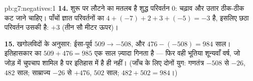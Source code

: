 \begin{solution}{pb:g7:negatives:1}
\textbf{14.} शुरू पर लौटने का मतलब है शुद्ध परिवर्तन $0$: चढ़ाव
और उतार ठीक-ठीक कट जाने चाहिए। पाँचों ज्ञात परिवर्तनों का 
$4 + (-7) + 2 + 3 + (-5) = -3$ है, इसलिए छठा परिवर्तन उसकी
 है: $+3$ (तीन सौ मीटर ऊपर)।

\textbf{15.} खगोलविदों के अनुसार: ईसा-पूर्व $509 \to -508$, और
$476 - (-508) = 984$ साल। इतिहासकार का $509 + 476 = 985$
एक साल ज़्यादा गिनता है --- फिर वही भूतिया शून्यवाँ वर्ष, जो जोड़
में चुपचाप शामिल है पर इतिहास में है ही नहीं।
(जाँच के लिए दोनों युग: गणतंत्र $-508$ से $-26$, $482$
साल; साम्राज्य $-26$ से $+476$, $502$ साल;
$482 + 502 = 984$।)

\end{solution}
